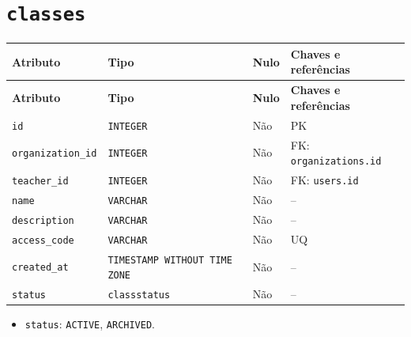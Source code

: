 \section*{\texttt{classes}}
\begingroup\footnotesize
\setlength{\tabcolsep}{4pt}\renewcommand{\arraystretch}{1.15}
\begin{longtable}{|>{\raggedright\arraybackslash}p{}|>{\raggedright\arraybackslash}p{}|>{\raggedright\arraybackslash}p{}|>{\raggedright\arraybackslash}p{}|}
\hline
\textbf{Atributo} & \textbf{Tipo} & \textbf{Nulo} & \textbf{Chaves e referências} \\ \hline
\endfirsthead
\hline \textbf{Atributo} & \textbf{Tipo} & \textbf{Nulo} & \textbf{Chaves e referências} \\ \hline
\endhead
\texttt{id} & \texttt{INTEGER} & Não & PK \\ \hline
\texttt{organization\_\allowbreak{}id} & \texttt{INTEGER} & Não & FK: \texttt{organizations.id} \\ \hline
\texttt{teacher\_\allowbreak{}id} & \texttt{INTEGER} & Não & FK: \texttt{users.id} \\ \hline
\texttt{name} & \texttt{VARCHAR} & Não & -- \\ \hline
\texttt{description} & \texttt{VARCHAR} & Não & -- \\ \hline
\texttt{access\_\allowbreak{}code} & \texttt{VARCHAR} & Não & UQ \\ \hline
\texttt{created\_\allowbreak{}at} & \texttt{TIMESTAMP WITHOUT TIME ZONE} & Não & -- \\ \hline
\texttt{status} & \texttt{classstatus} & Não & -- \\ \hline
\end{longtable}
\begin{itemize}
\item \texttt{status}: \texttt{ACTIVE}, \texttt{ARCHIVED}.
\end{itemize}
\endgroup


